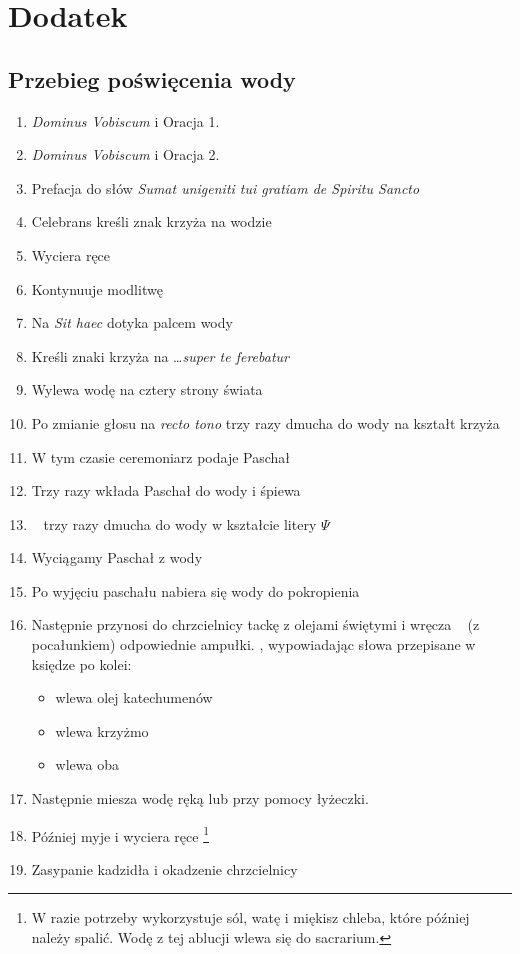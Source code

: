 \section{Dodatek}

\subsection{Przebieg poświęcenia wody}
\label{sec:woda}
\begin{enumerate}
      \item \textit{Dominus Vobiscum} i Oracja 1.
      \item \textit{Dominus Vobiscum} i Oracja 2.
      \item Prefacja do słów \textit{Sumat unigeniti tui gratiam de Spiritu
                  Sancto}
      \item Celebrans kreśli znak krzyża na wodzie
      \item Wyciera ręce
      \item Kontynuuje modlitwę
      \item Na \textit{Sit haec} dotyka palcem wody
      \item Kreśli znaki krzyża na \dots \textit{super te ferebatur}
      \item Wylewa wodę na cztery strony świata
      \item Po zmianie głosu na \textit{recto tono} trzy razy dmucha do wody na
            kształt krzyża
      \item W tym czasie ceremoniarz podaje Paschał
      \item Trzy razy wkłada Paschał do wody i śpiewa
      \item \ii~ trzy razy dmucha do wody w kształcie litery {\Large ${\Psi}$}
      \item Wyciągamy Paschał z wody
      \item Po wyjęciu paschału nabiera się wody do pokropienia
      \item Następnie  przynosi do chrzcielnicy tackę z olejami świętymi i
            wręcza \ii~ (z pocałunkiem) odpowiednie ampułki. \ii, wypowiadając
            słowa przepisane w księdze po kolei:
            \begin{itemize}
                  \item wlewa olej katechumenów
                  \item wlewa krzyżmo
                  \item wlewa oba
            \end{itemize}
      \item Następnie miesza wodę ręką lub przy pomocy łyżeczki.
      \item Później myje i wyciera ręce \footnote{W razie potrzeby wykorzystuje
                  sól, watę i miękisz chleba, które później należy spalić. Wodę
                  z tej ablucji wlewa
                  się do sacrarium.}
      \item Zasypanie kadzidła i okadzenie chrzcielnicy
\end{enumerate}

